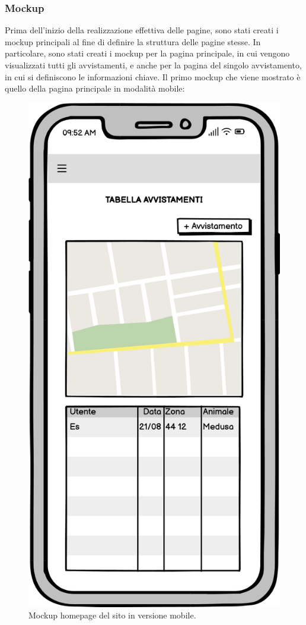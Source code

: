 \documentclass[a4paper,final,12pt]{report}
\begin{document}
\subsubsection{Mockup}
Prima dell'inizio della realizzazione effettiva delle pagine, sono stati creati i mockup principali al fine di definire la struttura delle pagine stesse. In particolare, sono stati creati i mockup per la pagina principale, in cui vengono visualizzati tutti gli avvistamenti, e anche per la pagina del singolo avvistamento, in cui si definiscono le informazioni chiave.
Il primo mockup che viene mostrato è quello della pagina principale in modalità mobile:
\begin{figure}[hbtp]
\centering
\includegraphics[scale=0.35]{img_concettuale/HomeMob.png}
\caption{Mockup homepage del sito in versione mobile.}
\label{figura:hommobmock}
\end{figure}
\end{document}
